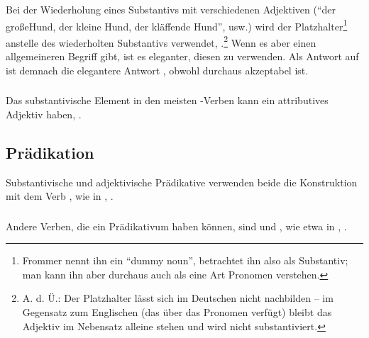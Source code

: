 \subsubsection{} Bei der Wiederholung eines Substantivs mit verschiedenen Adjektiven (``der große\linebreak Hund, der kleine Hund, der kläffende Hund'', usw.) wird der Platzhalter\footnote{Frommer nennt ihn ein ``dummy noun'', betrachtet ihn also als Substantiv; man kann ihn aber durchaus auch als eine Art Pronomen verstehen.}  anstelle des wiederholten Substantivs verwendet,  .\footnote{A. d. Ü.: Der Platzhalter lässt sich im Deutschen nicht nachbilden -- im Gegensatz zum Englischen (das über das Pronomen  verfügt) bleibt das Adjektiv im Nebensatz alleine stehen und wird nicht substantiviert.} Wenn es aber einen allgemeineren Begriff gibt, ist es eleganter, diesen zu verwenden. Als Antwort auf   ist demnach die elegantere Antwort  , obwohl  durchaus akzeptabel ist.\label{syn:pum:adj} 

\subsubsection{} Das substantivische Element in den meisten -Verben kann ein attributives Adjektiv haben,  .

\subsection{Prädikation} Substantivische und adjektivische Prädikative verwenden beide die Konstruktion mit dem Verb  , wie in  ,  .
\label{syn:predicates}

\subsubsection{} Andere Verben, die ein Prädikativum haben können, sind   und  , wie etwa in  ,  .

